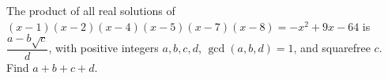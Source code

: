 The product of all real solutions of $(x-1)(x-2)(x-4)(x-5)(x-7)(x-8)=-x^2+9x-64$ is $\dfrac{a-b\sqrt c}{d}$, with positive integers $a,b,c,d$, $\gcd(a,b,d)=1$, and squarefree $c$. Find $a+b+c+d$.
